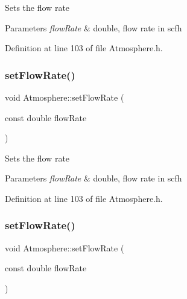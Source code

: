 Sets the flow rate 
\begin{DoxyParams}{Parameters}
{\em flow\+Rate} & double, flow rate in scfh \\
\hline
\end{DoxyParams}


Definition at line 103 of file Atmosphere.\+h.

\mbox{\label{class_atmosphere_a9ff0b718c810aec0bb101336db69fd22}} 
\subsubsection{\texorpdfstring{set\+Flow\+Rate()}{setFlowRate()}\hspace{0.1cm}{\footnotesize\ttfamily [2/3]}}
{\footnotesize\ttfamily void Atmosphere\+::set\+Flow\+Rate (\begin{DoxyParamCaption}\item[{const double}]{flow\+Rate }\end{DoxyParamCaption})\hspace{0.3cm}{\ttfamily [inline]}}

Sets the flow rate 
\begin{DoxyParams}{Parameters}
{\em flow\+Rate} & double, flow rate in scfh \\
\hline
\end{DoxyParams}


Definition at line 103 of file Atmosphere.\+h.

\mbox{\label{class_atmosphere_a9ff0b718c810aec0bb101336db69fd22}} 
\subsubsection{\texorpdfstring{set\+Flow\+Rate()}{setFlowRate()}\hspace{0.1cm}{\footnotesize\ttfamily [3/3]}}
{\footnotesize\ttfamily void Atmosphere\+::set\+Flow\+Rate (\begin{DoxyParamCaption}\item[{const double}]{flow\+Rate }\end{DoxyParamCaption})\hspace{0.3cm}{\ttfamily [inline]}}

